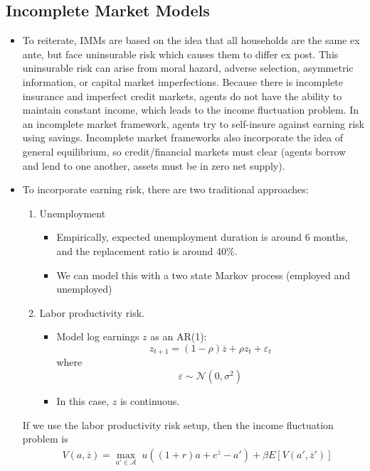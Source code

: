 \documentclass[12pt]{article}
\begin{document}
\subsection{Incomplete Market Models}

\begin{itemize}
    \item To reiterate, IMMs are based on the idea that all households are the same ex ante, but face uninsurable risk which causes them to differ ex post. This uninsurable risk can arise from moral hazard, adverse selection, asymmetric information, or capital market imperfections. Because there is incomplete insurance and imperfect credit markets, agents do not have the ability to maintain constant income, which leads to the income fluctuation problem. In an incomplete market framework, agents try to self-insure against earning risk using savings. Incomplete market frameworks also incorporate the idea of general equilibrium, so credit/financial markets must clear (agents borrow and lend to one another, assets must be in zero net supply).
    \item To incorporate earning risk, there are two traditional approaches:
    \begin{enumerate}
        \item Unemployment
        \begin{itemize}
            \item Empirically, expected unemployment duration is around 6 months, and the replacement ratio is around 40\%.
            \item We can model this with a two state Markov process (employed and unemployed)
        \end{itemize}
        \item Labor productivity risk.
        \begin{itemize}
            \item Model log earnings $z$ as an AR(1):
            \[z_{t+1} = (1-\rho)\overline{z} + \rho z_t + \varepsilon_t\]
            where
            \[\varepsilon \sim \mathcal{N}(0,\sigma^2)\]
            \item In this case, $z$ is continuous. 
        \end{itemize}
    \end{enumerate}
    If we use the labor productivity risk setup, then the income fluctuation problem is
    \[\begin{split}
        &V(a,\overline{z}) = \max_{a'\in\mathcal{A}}\; u((1+r)a + e^{\overline{z}} - a') + \beta E[V(a', \overline{z}')] \\

\end{split}\]
\end{itemize}
\end{document}
